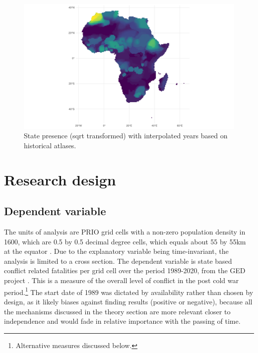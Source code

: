 \documentclass[12pt]{article}
\begin{document}

\begin{figure}[htpb]
	\centering
	\includegraphics[width=\linewidth]{../R/Output/sqrtSpAll.pdf}
	\caption{State presence (sqrt transformed) with interpolated years based
	on historical atlases.}
	\label{Sp_i}
\end{figure}


\section{Research design}

\subsection{Dependent variable}

The units of analysis are PRIO grid cells with a non-zero population density in
1600, which are 0.5 by 0.5 decimal degree
cells, which equals about 55 by 55km at the equator \citep{Tollefsen2012}. Due
to the explanatory variable being time-invariant, the analysis is limited to a
cross section. The dependent variable is state based conflict
related fatalities per grid cell over the period 1989-2020, from the GED project
\citep{Sundberg2013}. This is a measure of the overall level of
conflict in the post cold war period.\footnote{Alternative measures discussed
below.} The start date of 1989 was dictated by availability rather than chosen
by design, as it likely biases against finding results (positive or negative),
because all the mechanisms discussed in the theory section are more relevant
closer to independence and would fade in relative importance with the passing of
time.
\end{document}
